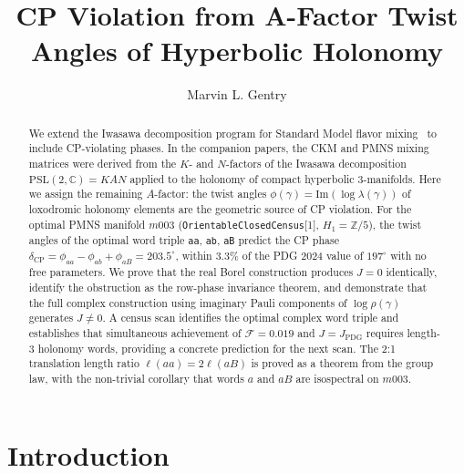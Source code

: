 \documentclass[epjc3]{svjour3}
\newcommand{\PSL}{\mathrm{PSL}(2,\mathbb{C})}
\begin{document}
\title{CP Violation from A-Factor Twist Angles of Hyperbolic Holonomy}

\author{Marvin L. Gentry}


\begin{abstract}
We extend the Iwasawa decomposition program for Standard Model flavor
mixing~\cite{Gentry:CKM,Gentry:PMNS} to include CP-violating phases.
In the companion papers, the CKM and PMNS mixing matrices were derived
from the $K$- and $N$-factors of the Iwasawa decomposition
$\PSL = KAN$ applied to the holonomy of compact hyperbolic 3-manifolds.
Here we assign the remaining $A$-factor: the twist angles
$\phi(\gamma) = \mathrm{Im}(\log\lambda(\gamma))$ of loxodromic holonomy
elements are the geometric source of CP violation.
For the optimal PMNS manifold $m003$
(\texttt{OrientableClosedCensus}[1], $H_1 = \mathbb{Z}/5$),
the twist angles of the optimal word triple \texttt{aa}, \texttt{ab},
\texttt{aB} predict the CP phase
$\delta_{\mathrm{CP}} = \phi_{aa} - \phi_{ab} + \phi_{aB} = 203.5^\circ$,
within $3.3\%$ of the PDG 2024 value of $197^\circ$ with no free parameters.
We prove that the real Borel construction produces $J = 0$ identically,
identify the obstruction as the row-phase invariance theorem,
and demonstrate that the full complex construction using imaginary
Pauli components of $\log\rho(\gamma)$ generates $J \neq 0$.
A census scan identifies the optimal complex word triple and
establishes that simultaneous achievement of $\mathcal{F} = 0.019$
and $J = J_{\mathrm{PDG}}$ requires length-3 holonomy words,
providing a concrete prediction for the next scan.
The 2:1 translation length ratio $\ell(aa) = 2\ell(aB)$ is proved
as a theorem from the group law, with the non-trivial corollary
that words $a$ and $aB$ are isospectral on $m003$.
\end{abstract}


\maketitle

\section{Introduction}
\label{sec:intro}
\end{document}
